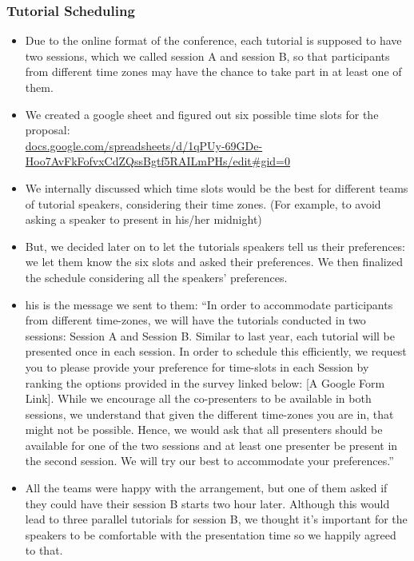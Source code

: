 \documentclass[%
10pt,								%
titlepage,						%
]
{scrartcl}
\begin{document}
\begin{itemize}
            \end{itemize}

        \subsubsection{Tutorial Scheduling}
            \begin{itemize}
                \item   Due to the online format of the conference, each tutorial is supposed to have two sessions, which we called session A and session B, so that participants from different time zones may have the chance to take part in at least one of them.

                \item   We created a google sheet and figured out six possible time slots for the proposal:\\ \href{https://docs.google.com/spreadsheets/d/1qPUy-69GDe-Hoo7AvFkFofvxCdZQssBgtf5RAILmPHs/edit#gid=0}{docs.google.com/spreadsheets/d/1qPUy-69GDe-Hoo7AvFkFofvxCdZQssBgtf5RAILmPHs/edit\#gid=0}

                \item We internally discussed which time slots would be the best for different teams of tutorial speakers, considering their time zones.  (For example, to avoid asking a speaker to present in his/her midnight)

                \item   But, we decided later on to let the tutorials speakers tell us their preferences: we let them know the six slots and asked their preferences.  We then finalized the schedule considering all the speakers' preferences.

                \item his is the message we sent to them: ``In order to accommodate participants from different time-zones, we will have the tutorials conducted in two sessions: Session A  and Session B. Similar to last year, each tutorial will be presented once in each session. In order to schedule this efficiently, we request you to please  provide your preference for time-slots in each Session by ranking the options provided in the survey linked below: [A Google Form Link].   While we encourage all the co-presenters to be available in both sessions, we understand that given the different time-zones you are in, that might not be possible. Hence, we would ask that all presenters should be available for one of the two sessions and at least one presenter be present in the second session. We will try our best to accommodate your preferences.''
                \item   All the teams were happy with the arrangement, but one of them asked if they could have their session B starts two hour later.  Although this would lead to three parallel tutorials for session B, we thought it's important for the speakers to be comfortable with the presentation time so we happily agreed to that.

            \end{itemize}
  
\end{document}

